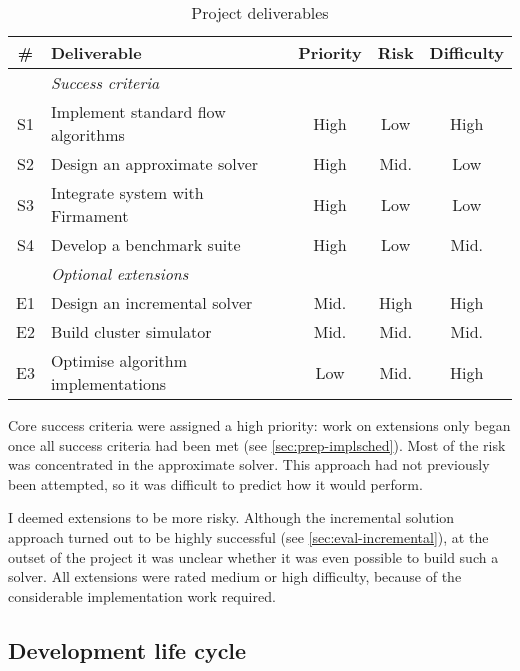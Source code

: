 \begin{table}
    \centering
    \begin{tabular}{clccc}
        \textbf{\#} & \textbf{Deliverable} & \textbf{Priority} & \textbf{Risk} & \textbf{Difficulty}
        \tabularnewline
        \hline
        & \textit{Success criteria} \tabularnewline
        S1 & Implement standard flow algorithms & High & Low & High \tabularnewline
        S2 & Design an approximate solver & High & Mid. & Low \tabularnewline
        S3 & Integrate system with Firmament & High & Low & Low \tabularnewline
        S4 & Develop a benchmark suite  & High & Low & Mid. \tabularnewline
        \hline
        & \textit{Optional extensions} \tabularnewline
        E1 & Design an incremental solver & Mid. & High & High \tabularnewline
        E2 & Build cluster simulator & Mid. & Mid. & Mid. \tabularnewline
        E3 & Optimise algorithm implementations & Low & Mid. & High \tabularnewline
        \hline
    \end{tabular}
    \caption{Project deliverables}
    \label{table:prep-project-requirements}
\end{table}

Core success criteria were assigned a high priority: work on extensions only began once all success criteria had been met (see \cref{sec:prep-implsched}). Most of the risk was concentrated in the approximate solver. This approach had not previously been attempted, so it was difficult to predict how it would perform.

I deemed extensions to be more risky. Although the incremental solution approach turned out to be highly successful (see \cref{sec:eval-incremental}), at the outset of the project it was unclear whether it was even possible to build such a solver. All extensions were rated medium or high difficulty, because of the considerable implementation work required.

\subsection{Development life cycle}
\label{sec:prep-management-model}


